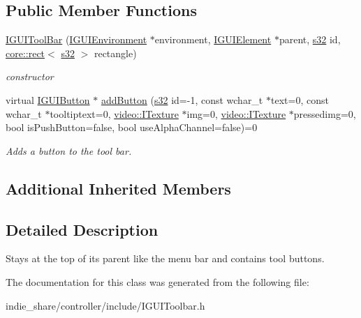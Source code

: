 \subsection*{Public Member Functions}
\begin{DoxyCompactItemize}
\item 
\mbox{\label{classirr_1_1gui_1_1IGUIToolBar_af58b2fe4ddf884e763882ac380753d37}} 
\hyperlink{classirr_1_1gui_1_1IGUIToolBar_af58b2fe4ddf884e763882ac380753d37}{I\+G\+U\+I\+Tool\+Bar} (\hyperlink{classirr_1_1gui_1_1IGUIEnvironment}{I\+G\+U\+I\+Environment} $\ast$environment, \hyperlink{classirr_1_1gui_1_1IGUIElement}{I\+G\+U\+I\+Element} $\ast$parent, \hyperlink{namespaceirr_ac66849b7a6ed16e30ebede579f9b47c6}{s32} id, \hyperlink{classirr_1_1core_1_1rect}{core\+::rect}$<$ \hyperlink{namespaceirr_ac66849b7a6ed16e30ebede579f9b47c6}{s32} $>$ rectangle)
\begin{DoxyCompactList}\small\item\em constructor \end{DoxyCompactList}\item 
\mbox{\label{classirr_1_1gui_1_1IGUIToolBar_ae7072e7db92448c0feca015d358a8fe4}} 
virtual \hyperlink{classirr_1_1gui_1_1IGUIButton}{I\+G\+U\+I\+Button} $\ast$ \hyperlink{classirr_1_1gui_1_1IGUIToolBar_ae7072e7db92448c0feca015d358a8fe4}{add\+Button} (\hyperlink{namespaceirr_ac66849b7a6ed16e30ebede579f9b47c6}{s32} id=-\/1, const wchar\+\_\+t $\ast$text=0, const wchar\+\_\+t $\ast$tooltiptext=0, \hyperlink{classirr_1_1video_1_1ITexture}{video\+::\+I\+Texture} $\ast$img=0, \hyperlink{classirr_1_1video_1_1ITexture}{video\+::\+I\+Texture} $\ast$pressedimg=0, bool is\+Push\+Button=false, bool use\+Alpha\+Channel=false)=0
\begin{DoxyCompactList}\small\item\em Adds a button to the tool bar. \end{DoxyCompactList}\end{DoxyCompactItemize}
\subsection*{Additional Inherited Members}


\subsection{Detailed Description}
Stays at the top of its parent like the menu bar and contains tool buttons. 

The documentation for this class was generated from the following file\+:\begin{DoxyCompactItemize}
\item 
indie\+\_\+share/controller/include/I\+G\+U\+I\+Toolbar.\+h\end{DoxyCompactItemize}
